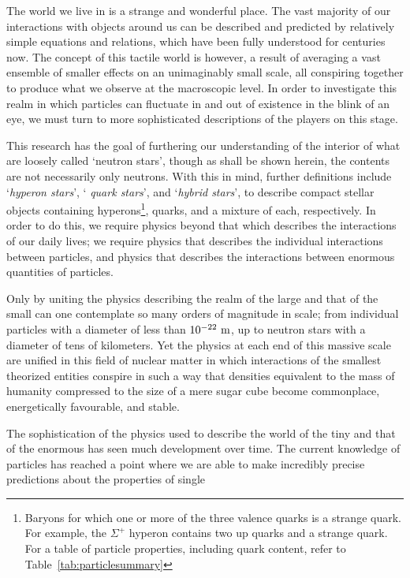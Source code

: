 \documentclass[11pt,a4paper,twoside]{carrollthesis}
\begin{document}
\dropcap The world we live in is a strange and wonderful place. The vast
majority of our interactions with objects around us can be described
and predicted by relatively simple equations and relations, which have
been fully understood for centuries now. The concept of this tactile
world is however, a result of averaging a vast ensemble of smaller
effects on an unimaginably small scale, all conspiring together to
produce what we observe at the macroscopic level. In order to
investigate this realm in which particles can fluctuate in and out of
existence in the blink of an eye, we must turn to more sophisticated
descriptions of the players on this stage.\par
%
This research has the goal of furthering our understanding of the
interior of what are loosely called `neutron stars', though as shall
be shown herein, the contents are not necessarily only neutrons. With
this in mind, further definitions include `{\it hyperon stars}', `{\it
  quark stars}', and `{\it hybrid stars}', to describe compact stellar
objects containing hyperons\footnote{Baryons for which one or more of
  the three valence quarks is a strange quark. For example, the
  $\Sigma^+$ hyperon contains two up quarks and a strange quark. For a
  table of particle properties, including quark content, refer to
  Table~\ref{tab:particlesummary}}, quarks, and a mixture of each,
  respectively. In order to do this, we require physics beyond that
  which describes the interactions of our daily lives; we require
  physics that describes the individual interactions between
  particles, and physics that describes the interactions between
  enormous quantities of particles.\par
%
Only by uniting the physics describing the realm of the large and that
of the small can one contemplate so many orders of magnitude in scale;
from individual particles with a diameter of less than $10^{-22}~{\rm
  m}$, up to neutron stars with a diameter of tens of kilometers. Yet
the physics at each end of this massive scale are unified in this
field of nuclear matter in which interactions of the smallest
theorized entities conspire in such a way that densities equivalent to
the mass of humanity compressed to the size of a mere sugar cube
become commonplace, energetically favourable, and stable.\par
%
The sophistication of the physics used to describe the world of the
tiny and that of the enormous has seen much development over time. The
current knowledge of particles has reached a point where we are able
to make incredibly precise predictions about the properties of single
\end{document}
